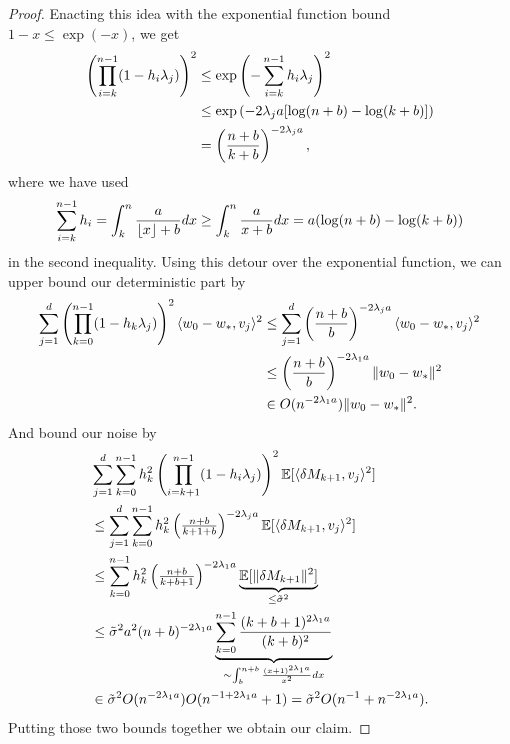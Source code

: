 \begin{proof}
	Enacting this idea with the exponential function bound \(1-x\le\exp(-x)\), we
	get
	\begin{align}
		\nonumber
		\left(\prod_{i=k}^{n-1}(1-h_i\lambda_j)\right)^2
		&\le\exp\left(-\sum_{i=k}^{n-1}h_i\lambda_j\right)^2\\
		\nonumber
		&\le \exp\left(-2\lambda_j a[\log(n+b)-\log(k+b)]\right)\\
		\label{eq: detour over exponential bound}
		&= \left(\frac{n+b}{k+b}\right)^{-2\lambda_j a},
	\end{align}
	where we have used
	\begin{align*}
		\sum_{i=k}^{n-1} h_i
		= \int_{k}^{n} \frac{a}{\lfloor x\rfloor+b} dx
		\ge \int_{k}^{n} \frac{a}{x+b} dx
		= a(\log(n+b) - \log(k+b))
	\end{align*}
	in the second inequality. Using this detour over the exponential function,
	we can upper bound our deterministic part by
	\begin{align}
		\nonumber
		\sum_{j=1}^d\left(\prod_{k=0}^{n-1}(1-h_k\lambda_j)\right)^2
		\langle w_0-w_*, v_j\rangle^2
		&\le \sum_{j=1}^d \left(\frac{n+b}{b}\right)^{-2\lambda_j a}
		\langle w_0-w_*, v_j\rangle^2\\
		\label{eq: upper bound on convergence rate using smallest eigenvalue 1}
		&\le \left(\frac{n+b}{b}\right)^{-2\lambda_1 a}\|w_0-w_*\|^2\\
		\nonumber
		&\in O(n^{-2\lambda_1a})\|w_0-w_*\|^2.
	\end{align}
	And bound our noise by
	\begin{align}
		\nonumber
		&\sum_{j=1}^d\sum_{k=0}^{n-1} h_k^2
		\left(\prod_{i=k+1}^{n-1}(1-h_i\lambda_j)\right)^2
		\mathbb{E}[\langle\delta M_{k+1},v_j\rangle^2]\\
		\nonumber
		&\le \sum_{j=1}^d
			\sum_{k=0}^{n-1} h_k^2 \left(\tfrac{n+b}{k+1+b}\right)^{-2\lambda_j a}
			\mathbb{E}[\langle\delta M_{k+1},v_j\rangle^2]
		\\
		\label{eq: upper bound on convergence rate using smallest eigenvalue 2}
		&\le \sum_{k=0}^{n-1} h_k^2 \left(\tfrac{n+b}{k+b+1}\right)^{-2\lambda_1 a}
		\underbrace{\mathbb{E}[\|\delta M_{k+1}\|^2]}_{\le \tilde{\sigma}^2}
		\\
		\nonumber
		&\le
		\tilde{\sigma}^2a^2 (n+b)^{-2\lambda_1 a}
		\underbrace{\sum_{k=0}^{n-1} \frac{(k+b+1)^{2\lambda_1 a}}{(k+b)^2}}_{
			\sim \int_b^{n+b} \frac{(x+1)^{2\lambda_1 a}}{x^2}dx} \\
		\nonumber
		&\in \tilde{\sigma}^2 O(n^{-2\lambda_1 a})  O(n^{-1+2\lambda_1a} + 1)
		= \tilde{\sigma}^2 O(n^{-1} + n^{-2\lambda_1 a}).
	\end{align}
	Putting those two bounds together we obtain our claim.
\end{proof}

